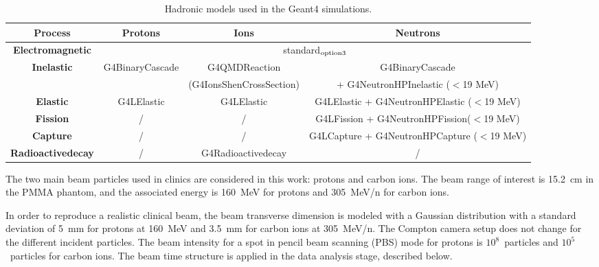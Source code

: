 \begin{table}[ht]
\label{physlist_ion}
\caption{Hadronic models used in the Geant4 simulations.}
\begin{scriptsize}
\begin{center}
\renewcommand{\arraystretch}{1.2}
\begin{tabular} {cccc}\hline
\textbf{Process} & \textbf{Protons} & \textbf{Ions} & \textbf{Neutrons} \\ \hline 
\textbf{Electromagnetic} & \multicolumn{3}{c}{standard$_{\rm{option3}}$} \\ %
\textbf{Inelastic} & G4BinaryCascade & G4QMDReaction  &  G4BinaryCascade  \\ 
 & & (G4IonsShenCrossSection)&+ G4NeutronHPInelastic ($<$19 MeV)\\ %
\textbf{Elastic} & G4LElastic & G4LElastic & G4LElastic + G4NeutronHPElastic ($<$19 MeV)\\ %
\textbf{Fission} & / & / & G4LFission + G4NeutronHPFission($<$19 MeV) \\ %
\textbf{Capture} & / & / & G4LCapture +  G4NeutronHPCapture ($<$19 MeV) \\ %
\textbf{Radioactivedecay} & / & G4Radioactivedecay & / \\ \hline
\end{tabular}
\end{center}
\end{scriptsize}
\label{table:table_modele_physic_CC_simulation_Hadronth}
\end{table}

The two main beam particles used in clinics are considered in this work: protons and carbon ions. The beam range of interest is 15.2~cm in the PMMA phantom, and the associated energy is 160~MeV for protons and 305~MeV/n for carbon ions.
 
In order to reproduce a realistic clinical beam, the beam transverse dimension is modeled with a Gaussian distribution with a standard deviation of 5~mm for protons at 160~MeV and 3.5~mm for carbon ions at 305~MeV/n. The Compton camera setup does not change for the different incident particles. The beam intensity for a spot in pencil beam scanning (PBS) mode for protons is $10^8$~particles and $10^5$~particles for carbon ions. The beam time structure is applied in the data analysis stage, described below.\newline

